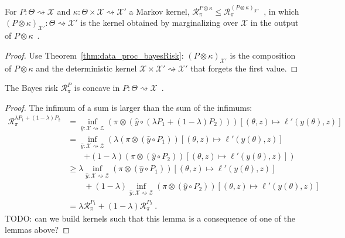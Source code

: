 \begin{lemma}
  \label{lem:bayesRisk_compProd_le_snd}
  For $P : \Theta \rightsquigarrow \mathcal X$ and $\kappa : \Theta \times \mathcal X \rightsquigarrow \mathcal X'$ a Markov kernel, $\mathcal R^{P \otimes \kappa}_\pi \le \mathcal R^{(P \otimes \kappa)_{\mathcal X'}}_\pi$~, in which $(P \otimes \kappa)_{\mathcal X'} : \mathcal \Theta \rightsquigarrow \mathcal X'$ is the kernel obtained by marginalizing over $\mathcal X$ in the output of $P \otimes \kappa$~.
\end{lemma}

\begin{proof}%
{}
Use Theorem~\ref{thm:data_proc_bayesRisk}: $(P \otimes \kappa)_{\mathcal X'}$ is the composition of $P \otimes \kappa$ and the deterministic kernel $\mathcal X \times \mathcal X' \rightsquigarrow \mathcal X'$ that forgets the first value.
\end{proof}

\begin{lemma}
  \label{lem:bayesRisk_concave}
  The Bayes risk $\mathcal R_\pi^P$ is concave in $P : \Theta \rightsquigarrow \mathcal X$~.
\end{lemma}

\begin{proof}%
\uses{}
The infimum of a sum is larger than the sum of the infimums:
\begin{align*}
\mathcal R_\pi^{\lambda P_1 + (1 - \lambda)P_2}
&= \inf_{\hat{y} : \mathcal X \rightsquigarrow \mathcal Z} (\pi \otimes (\hat{y} \circ (\lambda P_1 + (1 - \lambda)P_2)))\left[(\theta, z) \mapsto \ell'(y(\theta), z)\right]
\\
&= \inf_{\hat{y} : \mathcal X \rightsquigarrow \mathcal Z}  \left( \lambda (\pi \otimes (\hat{y} \circ P_1))\left[(\theta, z) \mapsto \ell'(y(\theta), z)\right] \right.
  \\&\qquad \left. + (1 - \lambda) (\pi \otimes (\hat{y} \circ P_2))\left[(\theta, z) \mapsto \ell'(y(\theta), z)\right] \right)
\\
&\ge \lambda \inf_{\hat{y} : \mathcal X \rightsquigarrow \mathcal Z} (\pi \otimes (\hat{y} \circ P_1))\left[(\theta, z) \mapsto \ell'(y(\theta), z)\right]
  \\&\qquad + (1 - \lambda) \inf_{\hat{y} : \mathcal X \rightsquigarrow \mathcal Z} (\pi \otimes (\hat{y} \circ P_2))\left[(\theta, z) \mapsto \ell'(y(\theta), z)\right]
\\
&= \lambda \mathcal R_\pi^{P_1} + (1 - \lambda)\mathcal R_\pi^{P_2}
\: .
\end{align*}
TODO: can we build kernels such that this lemma is a consequence of one of the lemmas above?
\end{proof}




